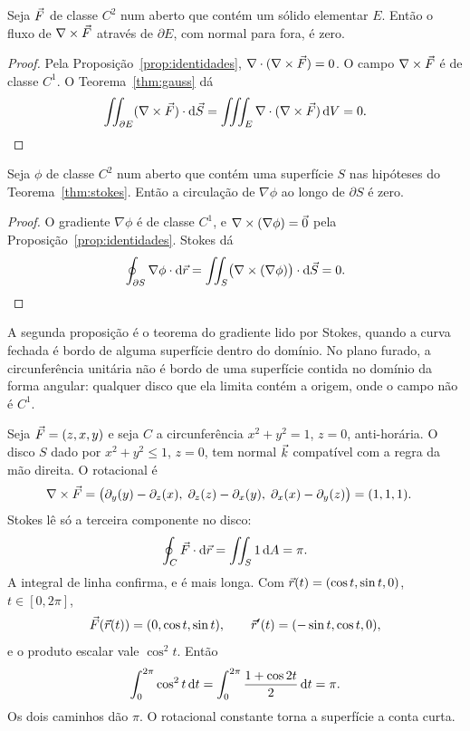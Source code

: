 \documentclass[11pt,a4paper]{article}
\begin{document}
\begin{proposicao}
\label{prop:fluxo-rot}
Seja $\vec{F}$ de classe $C^2$ num aberto que contém um sólido elementar $E$. Então o fluxo de $\nabla\times\vec{F}$ através de $\partial E$, com normal para fora, é zero.
\end{proposicao}

\begin{proof}
Pela Proposição~\ref{prop:identidades}, $\nabla\cdot(\nabla\times\vec{F})=0$. O campo $\nabla\times\vec{F}$ é de classe $C^1$. O Teorema~\ref{thm:gauss} dá
\[
\iint_{\partial E}(\nabla\times\vec{F})\cdot\mathrm{d}\vec{S}
=\iiint_E\nabla\cdot(\nabla\times\vec{F})\,\mathrm{d} V=0.
\]
\end{proof}

\begin{proposicao}
\label{prop:circ-grad}
Seja $\phi$ de classe $C^2$ num aberto que contém uma superfície $S$ nas hipóteses do Teorema~\ref{thm:stokes}. Então a circulação de $\nabla\phi$ ao longo de $\partial S$ é zero.
\end{proposicao}

\begin{proof}
O gradiente $\nabla\phi$ é de classe $C^1$, e $\nabla\times(\nabla\phi)=\vec{0}$ pela Proposição~\ref{prop:identidades}. Stokes dá
\[
\oint_{\partial S}\nabla\phi\cdot\mathrm{d}\vec{r}
=\iint_S\bigl(\nabla\times(\nabla\phi)\bigr)\cdot\mathrm{d}\vec{S}=0.
\]
\end{proof}

A segunda proposição é o teorema do gradiente lido por Stokes, quando a curva fechada é bordo de alguma superfície dentro do domínio. No plano furado, a circunferência unitária não é bordo de uma superfície contida no domínio da forma angular: qualquer disco que ela limita contém a origem, onde o campo não é $C^1$.

\begin{exemplo}
\label{ex:stokes-disco}
Seja $\vec{F}=(z,x,y)$ e seja $C$ a circunferência $x^2+y^2=1$, $z=0$, anti-horária. O disco $S$ dado por $x^2+y^2\le 1$, $z=0$, tem normal $\vec{k}$ compatível com a regra da mão direita. O rotacional é
\begin{align*}
\nabla\times\vec{F}
&=\bigl(\partial_y(y)-\partial_z(x),\;
\partial_z(z)-\partial_x(y),\;
\partial_x(x)-\partial_y(z)\bigr)
=(1,1,1).
\end{align*}
Stokes lê só a terceira componente no disco:
\[
\oint_C\vec{F}\cdot\mathrm{d}\vec{r}
=\iint_S 1\,\mathrm{d} A=\pi.
\]
A integral de linha confirma, e é mais longa. Com $\vec{r}(t)=(\cos t,\sin t,0)$, $t\in[0,2\pi]$,
\[
\vec{F}(\vec{r}(t))=(0,\cos t,\sin t),\qquad
\vec{r}'(t)=(-\sin t,\cos t,0),
\]
e o produto escalar vale $\cos^2 t$. Então
\[
\int_0^{2\pi}\cos^2 t\,\mathrm{d} t
=\int_0^{2\pi}\frac{1+\cos 2t}{2}\,\mathrm{d} t
=\pi.
\]
Os dois caminhos dão $\pi$. O rotacional constante torna a superfície a conta curta.
\end{exemplo}
\end{document}
